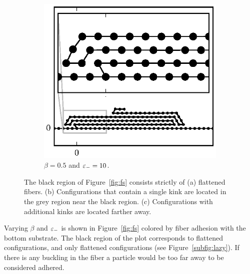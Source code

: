 \begin{figure}[h!]
		\begin{subfigure}{.5\textwidth}
			\centering
			\includegraphics{./fig/ch3/fs/b0.5_eb10.eps}
			\caption{$\beta=0.5$ and $\varepsilon_-=10$.\label{subfig:lazy_many_loops}}
		\end{subfigure}		
		\caption{The black region of Figure~\ref{fig:fs} consists strictly of (a) flattened fibers. (b) Configurations that contain a single kink are located in the grey region near the black region. (c) Configurations with additional kinks are located farther away.\label{fig:lazy}}	
	\end{figure}

Varying $\beta$ and $\varepsilon_-$ is shown in Figure~\ref{fig:fs} colored by fiber adhesion with the bottom substrate. The black region of the plot corresponds to flattened configurations, and only flattened configurations (see Figure~\ref{subfig:lazy}). If there is any buckling in the fiber a particle would be too far away to be considered adhered. 

